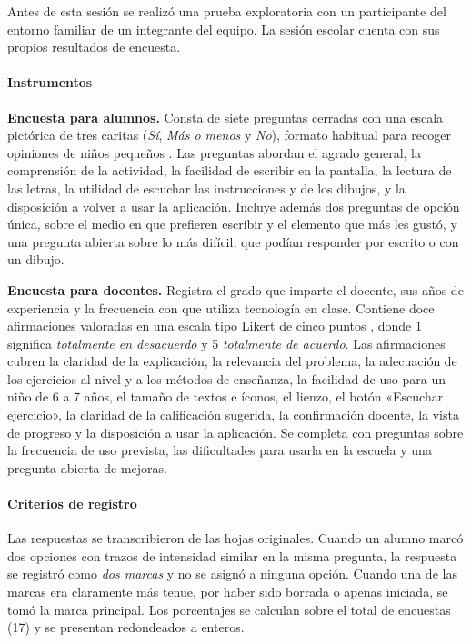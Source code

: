 Antes de esta sesión se realizó una prueba exploratoria con un participante del entorno familiar de un integrante del equipo. La sesión escolar cuenta con sus propios resultados de encuesta.

\paragraph{Instrumentos}
\textbf{Encuesta para alumnos.} Consta de siete preguntas cerradas con una escala pictórica de tres caritas (\textit{Sí}, \textit{Más o menos} y \textit{No}), formato habitual para recoger opiniones de niños pequeños \cite{read2006funtoolkit}. Las preguntas abordan el agrado general, la comprensión de la actividad, la facilidad de escribir en la pantalla, la lectura de las letras, la utilidad de escuchar las instrucciones y de los dibujos, y la disposición a volver a usar la aplicación. Incluye además dos preguntas de opción única, sobre el medio en que prefieren escribir y el elemento que más les gustó, y una pregunta abierta sobre lo más difícil, que podían responder por escrito o con un dibujo.

\textbf{Encuesta para docentes.} Registra el grado que imparte el docente, sus años de experiencia y la frecuencia con que utiliza tecnología en clase. Contiene doce afirmaciones valoradas en una escala tipo Likert de cinco puntos \cite{likert1932technique}, donde 1 significa \textit{totalmente en desacuerdo} y 5 \textit{totalmente de acuerdo}. Las afirmaciones cubren la claridad de la explicación, la relevancia del problema, la adecuación de los ejercicios al nivel y a los métodos de enseñanza, la facilidad de uso para un niño de 6 a 7 años, el tamaño de textos e íconos, el lienzo, el botón «Escuchar ejercicio», la claridad de la calificación sugerida, la confirmación docente, la vista de progreso y la disposición a usar la aplicación. Se completa con preguntas sobre la frecuencia de uso prevista, las dificultades para usarla en la escuela y una pregunta abierta de mejoras.

\paragraph{Criterios de registro}
Las respuestas se transcribieron de las hojas originales. Cuando un alumno marcó dos opciones con trazos de intensidad similar en la misma pregunta, la respuesta se registró como \textit{dos marcas} y no se asignó a ninguna opción. Cuando una de las marcas era claramente más tenue, por haber sido borrada o apenas iniciada, se tomó la marca principal. Los porcentajes se calculan sobre el total de encuestas (17) y se presentan redondeados a enteros.
